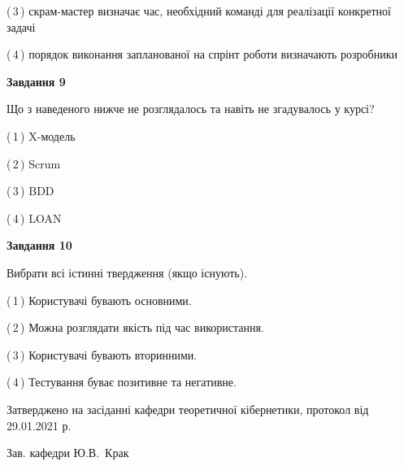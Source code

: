 \documentclass[10pt, ukrainian]{article}
\begin{document}
{\begin {large}
(\,3\,) скрам-мастер визначає час, необхідний команді для реалізації конкретної задачі%



(\,4\,) порядок виконання запланованої на спрінт роботи визначають розробники%


{\begin {center}\textbf{Завдання 9}\end {center}}\par
Що з наведеного нижче не розглядалось та навіть не згадувалось у курсі?\par
\vspace{2mm}



(\,1\,) X-модель%



(\,2\,) Scrum%



(\,3\,) BDD%



(\,4\,) LOAN%


{\begin {center}\textbf{Завдання 10}\end {center}}\par
Вибрати всі істинні твердження (якщо існують).\par
\vspace{2mm}



(\,1\,) Користувачі бувають основними.%



(\,2\,) Можна розглядати якість під час використання.%



(\,3\,) Користувачі бувають вторинними.%



(\,4\,) Тестування буває позитивне та негативне.%



\end {large}}
{\vspace{5mm}\smallskip \begin {small} Затверджено на засіданні кафедри теоретичної кібернетики, протокол  від   29.01.2021 р.\par\smallskip\smallskip
{\parbox {6.5 cm}{Зав. кафедри \dotfill Ю.В.~Крак}} \end{small}}
\newpage
\end{document}

